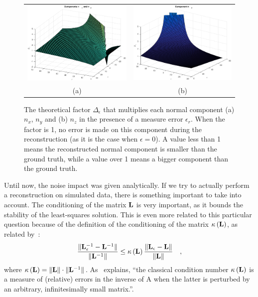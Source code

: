 \documentclass{report}
\begin{document}
\begin{figure}
  \centering
  \begin{tabular}{cc}
  \includegraphics[width=0.45\linewidth]{q3_analytic_nx_ny.pdf} &
  \includegraphics[width=0.45\linewidth]{q3_analytic_nz.pdf} \\
  (a) & (b)
  \end{tabular}
  \caption[Analytical normal component coefficients]
   {The theoretical factor $\Delta_\epsilon$ that multiplies each normal component (a) $n_x$, $n_y$ and (b) $n_z$ in the presence of a measure error $\epsilon_r$. When the factor is 1, no error is made on this component during the reconstruction (as it is the case when $\epsilon = 0$). A value less than 1 means the reconstructed normal component is smaller than the ground truth, while a value over 1 means a bigger component than the ground truth.}
  \label{q3:analytical}
\end{figure}

Until now, the noise impact was given analytically. If we try to actually perform a reconstruction on simulated data, there is something important to take into account. The conditioning of the matrix $\mathbf{L}$ is very important, as it bounds the stability of the least-squares solution. This is even more related to this particular question because of the definition of the conditioning of the matrix $\kappa \left(\mathbf{L}\right)$, as related by~\cite{ElGhaoui2002}:
\begin{equation}
\frac{ \| \mathbf{L}_\epsilon ^{-1} - \mathbf{L}^{-1} \| }{ \| \mathbf{L}^{-1} \| }
\le \kappa\left(\mathbf{L} \right) \frac{ \| \mathbf{L}_\epsilon - \mathbf{L}  \| }{ \| \mathbf{L} \| }
\quad,
\end{equation}
where $\kappa \left(\mathbf{L}\right) = \|\mathbf{L}\| \cdot \|\mathbf{L}^{-1}\|$. As~\cite{ElGhaoui2002} explains, ``the classical condition number $\kappa \left(\mathbf{L}\right)$ is a measure of (relative) errors in the inverse of A when the latter is perturbed by an arbitrary, infinitesimally small matrix.''.
\end{document}
